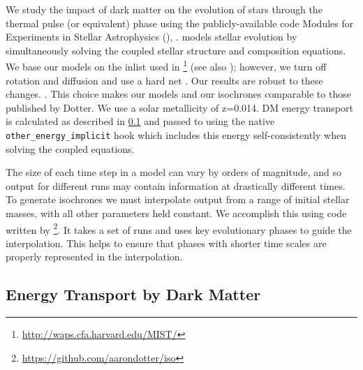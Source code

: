 \documentclass[useAMS,usenatbib]{mnras}
\begin{document}
  We study the impact of dark matter on the evolution of
  \mrange stars through the thermal pulse (or equivalent) phase using the publicly-available code Modules for Experiments in Stellar Astrophysics (\mesa), \citep{Paxton2011ModulesMESA}. \mesa models stellar evolution by simultaneously solving the coupled stellar structure and composition equations. We base our models on the \mesa inlist used in \citet{Choi2016mesaModels}\footnote{\url{http://waps.cfa.harvard.edu/MIST/}} (see also \citealt{Dotter2016MesaIsochrones}); however, we turn off rotation and diffusion and use a hard net .
  Our results are robust to these changes. . This choice makes our models and our isochrones comparable to those published by Dotter. We use a solar metallicity of z=0.014. DM energy transport is calculated as described in \ref{sub:energytransport} and passed to \mesa using the native \texttt{other\_energy\_implicit} hook which includes this energy self-consistently when solving the coupled equations.

  The size of each time step in a \mesa model can vary by orders of magnitude, and so output for different \mesa runs may contain information at drastically different times. To generate isochrones we must interpolate output from a range of initial stellar masses, with all other parameters held constant. We accomplish this using code written by \citet{Dotter2016MesaIsochrones}\footnote{\url{https://github.com/aarondotter/iso}}. It takes a set of \mesa runs and uses key evolutionary phases to guide the interpolation. This helps to ensure that phases with shorter time scales are properly represented in the interpolation.

\subsection{Energy Transport by Dark Matter}
\label{sub:energytransport}
\end{document}
